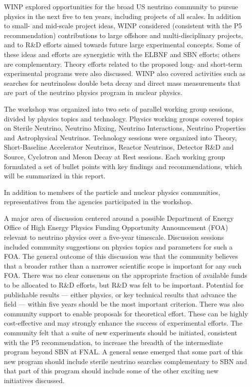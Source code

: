 WINP explored opportunities for the broad US neutrino community to
pursue physics in the next five to ten years, including projects of
all scales.  In addition to small- and mid-scale project ideas, WINP
considered (consistent with the P5 recommendation) contributions to
large offshore and multi-disciplinary projects, and to R\&D efforts
aimed towards future large experimental concepts.  Some of these ideas
and efforts are synergistic with the ELBNF and SBN efforts; others are
complementary.  Theory efforts related to the proposed long- and
short-term experimental programs were also discussed. WINP also
covered activities such as searches for neutrinoless double beta decay
and direct mass measurements that are part of the neutrino physics
program in nuclear physics.

The workshop was organized into two sets of parallel working group
sessions, divided by physics topics and technology.  Physics working
groups covered topics on Sterile Neutrino, Neutrino Mixing, Neutrino
Interactions, Neutrino Properties and Astrophysical Neutrinos.
Technology sessions were organized into Theory, Short-Baseline
Accelerator Neutrinos, Reactor Neutrinos, Detector R\&D and Source,
Cyclotron and Meson Decay at Rest sessions.  Each working group
formulated a set of bullet points with key findings and
recommendations, which will be summarized in this report.

In addition to members of the particle and nuclear physics
communities, representatives from the agencies participated in the workshop.

A major area of discussion centered around a possible Department of
Energy Office of High Energy Physics Funding Opportunity Announcement
(FOA) relevant to neutrino physics over a five-year timescale.
Discussion sessions included community suggestions on physics topics
and parameters for such a FOA.  The general outcome of this discussion
was that the community believes that a broader rather than a narrower
scientific scope is important for any such FOA.  There was no clear
consensus on the appropriate fraction of available funds to be
allocated to R\&D efforts, but R\&D was felt to be important.
Potential for publishable results --- either physics, or key technical
results that advance the field --- within five years should be the
most important criterion.  There was also community support to enable
proposals for theoretical effort.  These can be highly cost-effective
and may strongly enhance the success of experimental efforts.
The community felt that a suite of new experiments should be
initiated, consistent with the P5 recommendation, to increase the
breadth of the intermediate program beyond SBN at FNAL. A general
sense emerged that some part of this new program should include
sterile neutrino searches complementary to SBN and that part of this
program should include some of the other exciting new initiatives
discussed.

